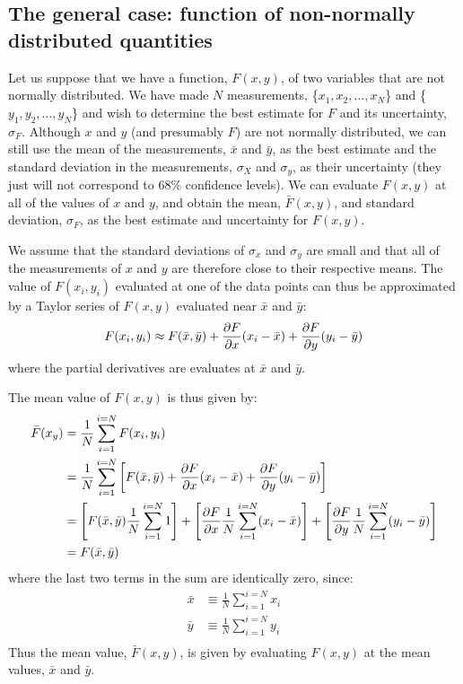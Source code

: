 \subsection{The general case: function of non-normally distributed quantities}
\label{sec:generalFgauss}
Let us suppose that we have a function, $F(x,y)$, of two variables that are not normally distributed. We have made $N$ measurements, \{$x_1, x_2, \dots, x_N$\} and \{$y_1, y_2, \dots, y_N$\} and wish to determine the best estimate for $F$ and its uncertainty, $\sigma_F$. Although $x$ and $y$ (and presumably $F$) are not normally distributed, we can still use the mean of the measurements, $\bar x$ and $\bar y$, as the best estimate and the standard deviation in the measurements, $\sigma_X$ and $\sigma_y$, as their uncertainty (they just will not correspond to 68\% confidence levels). We can evaluate $F(x,y)$ at all of the values of $x$ and $y$, and obtain the mean, $\bar F(x,y)$, and standard deviation, $\sigma_F$, as the best estimate and uncertainty for $F(x,y)$. 

We assume that the standard deviations of $\sigma_x$ and $\sigma_y$ are small and that all of the measurements of $x$ and $y$ are therefore close to their respective means. The value of $F(x_i,y_i)$ evaluated at one of the data points can thus be approximated by a Taylor series of $F(x,y)$ evaluated near $\bar x$ and $\bar y$:
\begin{align}
F(x_i,y_i)\approx F(\bar x,\bar y)+\frac{\partial F}{\partial x}(x_i-\bar x)+\frac{\partial F}{\partial y}(y_i-\bar y)
\end{align} 
where the partial derivatives are evaluates at $\bar x$ and $\bar y$.

The mean value of $F(x,y)$ is thus given by:
\begin{align}
\bar F(x_y)&=\frac{1}{N}\sum_{i=1}^{i=N}F(x_i,y_i)\nonumber\\
&=\frac{1}{N}\sum_{i=1}^{i=N} \left[ F(\bar x,\bar y)+\frac{\partial F}{\partial x}(x_i-\bar x)+\frac{\partial F}{\partial y}(y_i-\bar y)  \right]\nonumber\\
&=\left[F(\bar x,\bar y)\frac{1}{N}\sum_{i=1}^{i=N}1 \right]+\left[\frac{\partial F}{\partial x}\frac{1}{N}\sum_{i=1}^{i=N}(x_i-\bar x) \right]+\left[\frac{\partial F}{\partial y}\frac{1}{N}\sum_{i=1}^{i=N}(y_i-\bar y) \right]\nonumber\\
&=F(\bar x,\bar y)
\end{align}
where the last two terms in the sum are identically zero, since:
\begin{align}
\bar x &\equiv \frac{1}{N}\sum_{i=1}^{i=N}x_i\nonumber\\
\bar y &\equiv \frac{1}{N}\sum_{i=1}^{i=N}y_i\nonumber\\
\end{align} 
Thus the mean value, $\bar F(x,y)$, is given by evaluating $F(x,y)$ at the mean values, $\bar x$ and $\bar y$.

